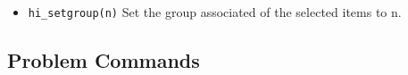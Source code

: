 \begin{itemize}
Meshed with elements that span at most \texttt{maxsegdeg} degrees
per element

Boundary property \texttt{"propname"}

\texttt{hide}: 0 = not hidden in post-processor, 1 == hidden in post
processor

A member of group number \texttt{group}

A member of the conductor specified by the string
\texttt{"inconductor".} If the segment is not part of a conductor,
this parameter can be specified as
\texttt{"<None>"}.

\item{\tt hi\_setgroup(n)} Set the group associated of the selected items to n.

\end{itemize}

\subsection{Problem Commands}

